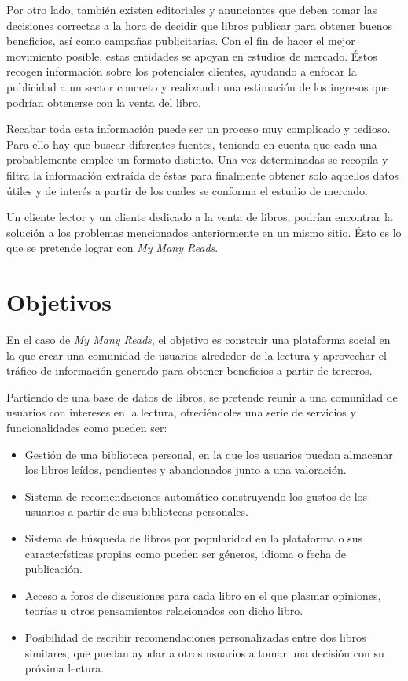 Por otro lado, también existen editoriales y anunciantes que deben tomar las decisiones correctas a la hora de decidir que libros publicar para obtener buenos beneficios, así como campañas publicitarias. Con el fin de hacer el mejor movimiento posible, estas entidades se apoyan en estudios de mercado. Éstos recogen información sobre los potenciales clientes, ayudando a enfocar la publicidad a un sector concreto y realizando una estimación de los ingresos que podrían obtenerse con la venta del libro.

Recabar toda esta información puede ser un proceso muy complicado y tedioso. Para ello hay que buscar diferentes fuentes, teniendo en cuenta que cada una probablemente emplee un formato distinto. Una vez determinadas se  recopila y filtra la información extraída de éstas para finalmente obtener solo aquellos datos útiles y de interés a partir de los cuales se conforma el estudio de mercado.

Un cliente lector y un cliente dedicado a la venta de libros, podrían encontrar la solución a los problemas mencionados anteriormente en un mismo sitio. Ésto es lo que se pretende lograr con \textit{My Many Reads}.

\section{Objetivos}
En el caso de \textit{My Many Reads}, el objetivo es construir una plataforma social en la que crear una comunidad de usuarios alrededor de la lectura y aprovechar el tráfico de información generado para obtener beneficios a partir de terceros. 

Partiendo de una base de datos de libros, se pretende reunir a una comunidad de usuarios con intereses en la lectura, ofreciéndoles una serie de servicios y funcionalidades como pueden ser:

\begin{itemize}
    \item Gestión de una biblioteca personal, en la que los usuarios puedan almacenar los libros leídos, pendientes y abandonados junto a una valoración.
    \item Sistema de recomendaciones automático construyendo los gustos de los usuarios a partir de sus bibliotecas personales.
    \item Sistema de búsqueda de libros por popularidad en la plataforma o sus características propias como pueden ser géneros, idioma o fecha de publicación.
    \item Acceso a foros de discusiones para cada libro en el que plasmar opiniones, teorías u otros pensamientos relacionados con dicho libro.
    \item Posibilidad de escribir recomendaciones personalizadas entre dos libros similares, que puedan ayudar a otros usuarios a tomar una decisión con su próxima lectura.
\end{itemize}

